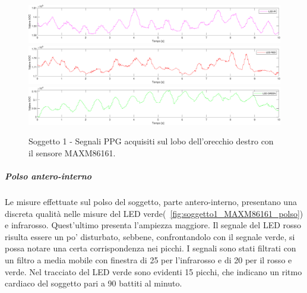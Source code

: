 \begin{figure}[h]
	\centering
	\includegraphics[width=1\linewidth]{ImageFiles/Misure Preliminari/Soggetto 1/MAXM86161/lobo_ired}
	\includegraphics[width=1\linewidth]{ImageFiles/Misure Preliminari/Soggetto 1/MAXM86161/lobo_red}
	\includegraphics[width=1\linewidth]{ImageFiles/Misure Preliminari/Soggetto 1/MAXM86161/lobo_green}
	\caption{Soggetto 1 - Segnali PPG acquisiti sul lobo dell'orecchio destro con il sensore MAXM86161.}
	\label{fig:soggetto1_MAXM86161_lobo}
\end{figure}

\clearpage

\subparagraph{Polso antero-interno}

Le misure effettuate sul polso del soggetto, parte antero-interno, presentano una discreta qualità nelle misure del LED verde(\Fig~\ref{fig:soggetto1_MAXM86161_polso}) e infrarosso. Quest'ultimo presenta l'ampiezza maggiore. Il segnale del LED rosso risulta essere un po' disturbato, sebbene, confrontandolo con il segnale verde, si possa notare una certa corrispondenza nei picchi. I segnali sono stati filtrati con un filtro a media mobile con finestra di  25 per l'infrarosso e di 20 per il rosso e verde. Nel tracciato del LED verde sono evidenti 15 picchi, che indicano un ritmo cardiaco del soggetto pari a 90 battiti al minuto.

